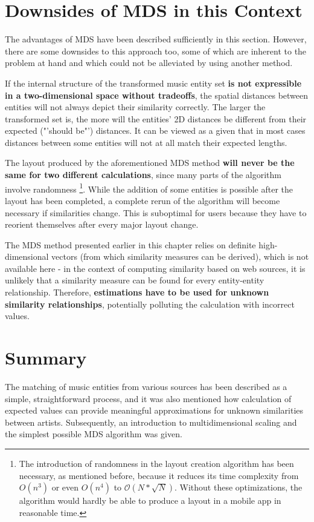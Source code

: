 \section{Downsides of MDS in this Context}

The advantages of MDS have been described sufficiently in this section. However, there are some downsides to this approach too, some of which are inherent to the problem at hand and which could not be alleviated by using another method.

If the internal structure of the transformed music entity set \textbf{is not expressible in a two-dimensional space without tradeoffs}, the spatial distances between entities will not always depict their similarity correctly. The larger the transformed set is, the more will the entities' 2D distances be different from their expected ("'should be"') distances. It can be viewed as a given that in most cases distances between some entities will not at all match their expected lengths.

The layout produced by the aforementioned MDS method \textbf{will never be the same for two different calculations}, since many parts of the algorithm involve randomness 
\footnote{The introduction of randomness in the layout creation algorithm has been necessary, as mentioned before, because it reduces its time complexity from $O(n^3)$ or even $O(n^4)$ to $\mathcal O(N*\sqrt{N})$. Without these optimizations, the algorithm would hardly be able to produce a layout in a mobile app in reasonable time.}.
While the addition of some entities is possible after the layout has been completed, a complete rerun of the algorithm will become necessary if similarities change. This is suboptimal for users because they have to reorient themselves after every major layout change.

The MDS method presented earlier in this chapter relies on definite high-dimensional vectors (from which similarity measures can be derived), which is not available here - in the context of computing similarity based on web sources, it is unlikely that a similarity measure can be found for every entity-entity relationship. Therefore, \textbf{estimations have to be used for unknown similarity relationships}, potentially polluting the calculation with incorrect values.

\section{Summary}

The matching of music entities from various sources has been described as a simple, straightforward process, and it was also mentioned how calculation of expected values can provide meaningful approximations for unknown similarities between artists. Subsequently, an introduction to multidimensional scaling and the simplest possible MDS algorithm was given. 


